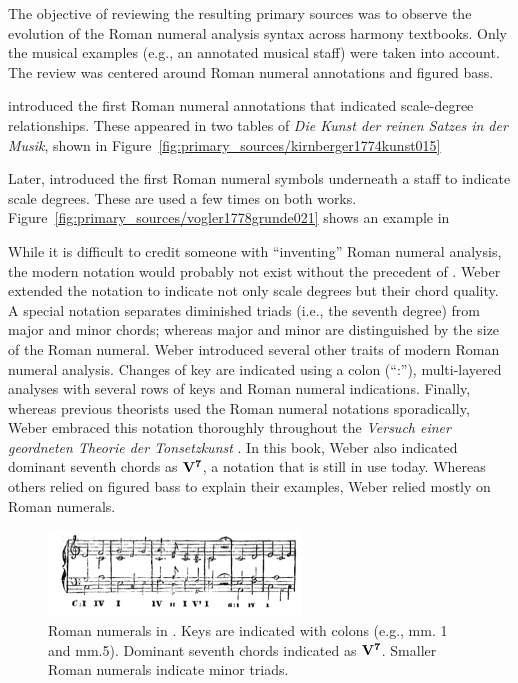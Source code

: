 The objective of reviewing the resulting primary sources was to observe the evolution of the Roman numeral analysis syntax across harmony textbooks.
Only the musical examples (e.g., an annotated musical staff) were taken into account.
The review was centered around Roman numeral annotations and figured bass.

\textcite{kirnberger1774kunst} introduced the first Roman numeral annotations that indicated scale-degree relationships.
These appeared in two tables of \emph{Die Kunst der reinen Satzes in der Musik}, shown in Figure~\ref{fig:primary_sources/kirnberger1774kunst015}


Later, \textcite{vogler1778grunde, vogler1802handbuch} introduced the first Roman numeral symbols underneath a staff to indicate scale degrees.
These are used a few times on both works.
Figure~\ref{fig:primary_sources/vogler1778grunde021} shows an example in \textcite{vogler1778grunde}


While it is difficult to credit someone with ``inventing'' Roman numeral analysis, the modern notation would probably not exist without the precedent of \textcite{weber1817versuch}.
Weber extended the notation to indicate not only scale degrees but their chord quality.
A special notation separates diminished triads (i.e., the seventh degree) from major and minor chords; whereas major and minor are distinguished by the size of the Roman numeral.
Weber introduced several other traits of modern Roman numeral analysis.
Changes of key are indicated using a colon (``:''), multi-layered analyses with several rows of keys and Roman numeral indications.
Finally, whereas previous theorists used the Roman numeral notations sporadically, Weber embraced this notation thoroughly throughout the \emph{Versuch einer geordneten Theorie der Tonsetzkunst} \parencite{weber1817versuch}.
In this book, Weber also indicated dominant seventh chords as $\textbf{V}\relax\relax{\footnotesize {}^\textbf{7}\relax\relax}$, a notation that is still in use today.
Whereas others relied on figured bass to explain their examples, Weber relied mostly on Roman numerals.

\begin{figure}[h!]
    \centering
    \includegraphics[width=0.6\textwidth]{figures/chapter/2/primary_sources/weber1817versuch205.png}
    \caption{Roman numerals in \textcite{weber1817versuch}. Keys are indicated with colons (e.g., mm. 1 and mm.5). Dominant seventh chords indicated as $\textbf{V}\relax\relax{\footnotesize {}^\textbf{7}\relax\relax}$. Smaller Roman numerals indicate minor triads.}
    \label{fig:weber1817versuch205}
\end{figure}

